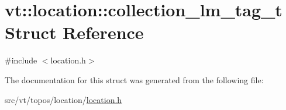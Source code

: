 \hypertarget{structvt_1_1location_1_1collection__lm__tag__t}{}\section{vt\+:\+:location\+:\+:collection\+\_\+lm\+\_\+tag\+\_\+t Struct Reference}
\label{structvt_1_1location_1_1collection__lm__tag__t}


{\ttfamily \#include $<$location.\+h$>$}



The documentation for this struct was generated from the following file\+:\begin{DoxyCompactItemize}
\item 
src/vt/topos/location/\hyperlink{location_8h}{location.\+h}\end{DoxyCompactItemize}
